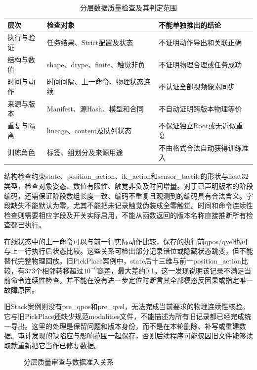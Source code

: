 \begin{table}[htbp]
 \centering\small
 \caption{分层数据质量检查及其判定范围}
 \label{tab:ch04_quality_gates}
 \begin{tabular}{p{}p{}p{}}
 \hline
 层次 & 检查对象 & 不能单独推出的结论\\
 \hline
 执行与验证 & 任务结果、Strict配置及状态 & 不证明动作导出和关联正确\\
 结构与数值 & shape、dtype、finite、触觉非负 & 不证明物理合理或任务成功\\
 时间与动作 & 时间间隔、上一命令、物理状态连续 & 不认证全部视频像素同步\\
 来源与版本 & Manifest、源Hash、模型和合同 & 不自动证明跨版本物理等价\\
 重复与隔离 & lineage、content及队列状态 & 不保证独立Root或无近似重复\\
 训练角色 & 标签、组划分及来源用途 & 不由格式合法自动获得训练准入\\
 \hline
 \end{tabular}
\end{table}

结构检查约束state、position\_action、ik\_action和sensor\_tactile的形状与float32类型，检查对象姿态、数值有限性、触觉非负及时间增量。对于已声明版本的阶段编码，还需保证阶段数组长度一致、编码不重复且观测到的编码具有合法含义。字段缺失不能默认为零，尤其不能把未记录触觉伪装成全零触觉。时间和命令连续性检查则需要相应字段及开关实际启用，不能从函数返回的版本名称直接推断所有检查都已执行。

在线状态中的上一命令可以与前一行实际动作比较，保存的执行前qpos/qvel也可与上一行执行后状态比较。这些关系可检出部分记录错位或隐藏状态跳变，但不能替代完整物理回放。旧PickPlace案例中，state后十三维与前一position\_action比较，有373个相邻转移超过$10^{-6}$容差，最大差约0.1。这一发现说明该记录不满足当前命令连续性检查，并不能在没有进一步定位时断言其全部模态反因果或指定唯一故障原因。

旧Stack案例则没有pre\_qpos和pre\_qvel，无法完成当前要求的物理连续性核验。它与旧PickPlace还缺少规范modalities文件，不能描述为所有旧记录都已经完成统一导出。这里的处理是保留问题和版本身份，而不是在本轮删除、补写或重建数据。审计发现的缺陷应与影响范围一起保存，否则后续程序可能仅因旧文件能够读取就重新把它当作已修复数据。

\begin{figure}[htbp]
 \centering
 \caption{分层质量审查与数据准入关系}
 \label{fig:ch04_admission}
\end{figure}

